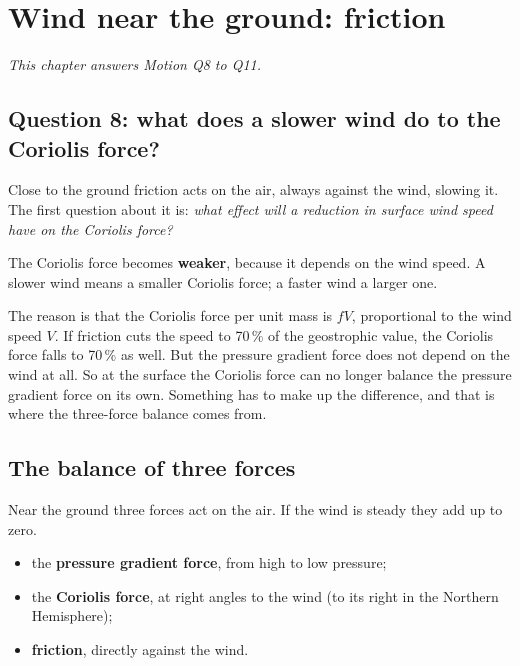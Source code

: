 \chapter{Wind near the ground: friction}\label{p3-ch:fric}


\textit{This chapter answers Motion Q8 to Q11.}

\section{Question 8: what does a slower wind do to the Coriolis force?}

Close to the ground friction acts on the air, always against the wind, slowing it. The first question about it is: \emph{what effect will a reduction in surface wind speed have on the Coriolis force?}

\begin{answerbox}
The Coriolis force becomes \textbf{weaker}, because it depends on the wind speed. A slower wind means a smaller Coriolis force; a faster wind a larger one.
\end{answerbox}

The reason is that the Coriolis force per unit mass is $fV$, proportional to the wind speed $V$. If friction cuts the speed to 70\,\% of the geostrophic value, the Coriolis force falls to 70\,\% as well. But the pressure gradient force does not depend on the wind at all. So at the surface the Coriolis force can no longer balance the pressure gradient force on its own. Something has to make up the difference, and that is where the three-force balance comes from.

\section{The balance of three forces}

Near the ground three forces act on the air. If the wind is steady they add up to zero.
\begin{itemize}
\item the \textcolor{fred}{\textbf{pressure gradient force}}, from high to low pressure;
\item the \textcolor{fblue}{\textbf{Coriolis force}}, at right angles to the wind (to its right in the Northern Hemisphere);
\item \textcolor{fgreen!70!black}{\textbf{friction}}, directly against the wind.
\end{itemize}

